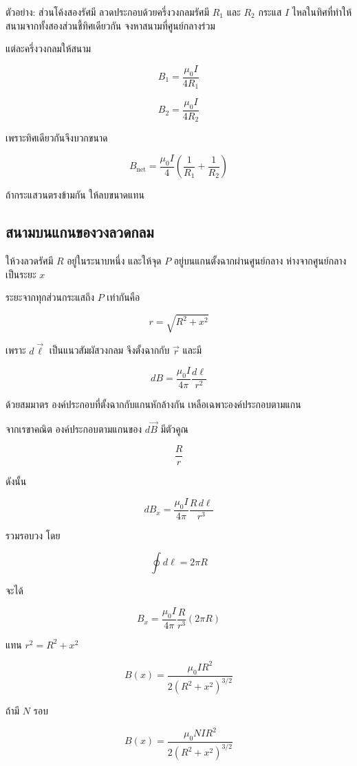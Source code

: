 \begin{examplebox}{ตัวอย่าง: ส่วนโค้งสองรัศมี}
ลวดประกอบด้วยครึ่งวงกลมรัศมี $R_1$ และ $R_2$ กระแส $I$ ไหลในทิศที่ทำให้สนามจากทั้งสองส่วนชี้ทิศเดียวกัน จงหาสนามที่ศูนย์กลางร่วม

แต่ละครึ่งวงกลมให้สนาม

\[
B_1=\frac{\mu_0 I}{4R_1}
\]

\[
B_2=\frac{\mu_0 I}{4R_2}
\]

เพราะทิศเดียวกันจึงบวกขนาด

\[
\boxed{
B_{\text{net}}
=
\frac{\mu_0 I}{4}
\left(
\frac{1}{R_1}+\frac{1}{R_2}
\right)}
\]

ถ้ากระแสวนตรงข้ามกัน ให้ลบขนาดแทน
\end{examplebox}

\subsection{สนามบนแกนของวงลวดกลม}

ให้วงลวดรัศมี $R$ อยู่ในระนาบหนึ่ง และให้จุด $P$ อยู่บนแกนตั้งฉากผ่านศูนย์กลาง ห่างจากศูนย์กลางเป็นระยะ $x$

ระยะจากทุกส่วนกระแสถึง $P$ เท่ากันคือ

\[
r=\sqrt{R^2+x^2}
\]

เพราะ $d\vec{\ell}$ เป็นแนวสัมผัสวงกลม จึงตั้งฉากกับ $\vec{r}$ และมี

\[
dB
=
\frac{\mu_0 I}{4\pi}
\frac{d\ell}{r^2}
\]

ด้วยสมมาตร องค์ประกอบที่ตั้งฉากกับแกนหักล้างกัน เหลือเฉพาะองค์ประกอบตามแกน

จากเรขาคณิต องค์ประกอบตามแกนของ $d\vec{B}$ มีตัวคูณ

\[
\frac{R}{r}
\]

ดังนั้น

\[
dB_x
=
\frac{\mu_0 I}{4\pi}
\frac{R\,d\ell}{r^3}
\]

รวมรอบวง โดย

\[
\oint d\ell=2\pi R
\]

จะได้

\[
B_x
=
\frac{\mu_0 I}{4\pi}
\frac{R}{r^3}
(2\pi R)
\]

แทน $r^2=R^2+x^2$

\begin{tcolorbox}[title={สนามบนแกนของวงลวดหนึ่งรอบ}]
\[
\boxed{
B(x)
=
\frac{\mu_0 I R^2}
{2(R^2+x^2)^{3/2}}}
\]
\end{tcolorbox}

ถ้ามี $N$ รอบ

\[
\boxed{
B(x)
=
\frac{\mu_0 NI R^2}
{2(R^2+x^2)^{3/2}}}
\]

